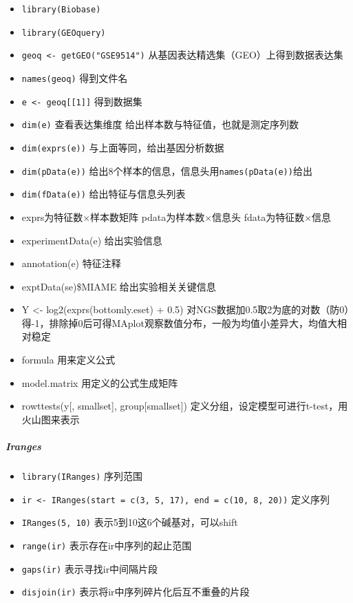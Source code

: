 \documentclass[
]{book}
\providecommand{\tightlist}{%
  \setlength{\itemsep}{0pt}\setlength{\parskip}{0pt}}
\begin{document}
\begin{itemize}
\tightlist
\item
  \texttt{library(Biobase)}
\item
  \texttt{library(GEOquery)}
\item
  \texttt{geoq\ \textless{}-\ getGEO("GSE9514")} 从基因表达精选集（GEO）上得到数据表达集
\item
  \texttt{names(geoq)} 得到文件名
\item
  \texttt{e\ \textless{}-\ geoq{[}{[}1{]}{]}} 得到数据集
\item
  \texttt{dim(e)} 查看表达集维度 给出样本数与特征值，也就是测定序列数
\item
  \texttt{dim(exprs(e))} 与上面等同，给出基因分析数据
\item
  \texttt{dim(pData(e))} 给出8个样本的信息，信息头用\texttt{names(pData(e))}给出
\item
  \texttt{dim(fData(e))} 给出特征与信息头列表
\item
  exprs为特征数×样本数矩阵 pdata为样本数×信息头 fdata为特征数×信息
\item
  experimentData(e) 给出实验信息
\item
  annotation(e) 特征注释
\item
  exptData(se)\$MIAME 给出实验相关关键信息
\item
  Y \textless- log2(exprs(bottomly.eset) + 0.5) 对NGS数据加0.5取2为底的对数（防0）得-1，排除掉0后可得MAplot观察数值分布，一般为均值小差异大，均值大相对稳定
\item
  formula 用来定义公式
\item
  model.matrix 用定义的公式生成矩阵
\item
  rowttests(y{[}, smallset{]}, group{[}smallset{]}) 定义分组，设定模型可进行t-test，用火山图来表示
\end{itemize}

\hypertarget{iranges}{%
\subparagraph{Iranges}\label{iranges}}

\begin{itemize}
\tightlist
\item
  \texttt{library(IRanges)} 序列范围
\item
  \texttt{ir\ \textless{}-\ IRanges(start\ =\ c(3,\ 5,\ 17),\ end\ =\ c(10,\ 8,\ 20))} 定义序列
\item
  \texttt{IRanges(5,\ 10)} 表示5到10这6个碱基对，可以shift
\item
  \texttt{range(ir)} 表示存在ir中序列的起止范围
\item
  \texttt{gaps(ir)} 表示寻找ir中间隔片段
\item
  \texttt{disjoin(ir)} 表示将ir中序列碎片化后互不重叠的片段
\end{itemize}
\end{document}
